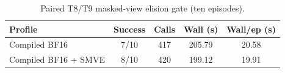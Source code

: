 \begin{table}
\caption{Paired T8/T9 masked-view elision gate (ten episodes).}
\label{tab:smve}
\centering\small
\begin{tabular}{lcccc}
\toprule
Profile & Success & Calls & Wall (s) & Wall/ep (s) \\
\midrule
Compiled BF16 & 7/10 & 417 & 205.79 & 20.58 \\
Compiled BF16 + SMVE & 8/10 & 420 & 199.12 & 19.91 \\
\bottomrule
\end{tabular}
\end{table}
